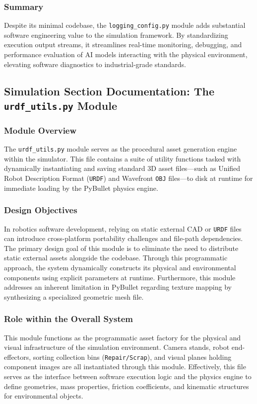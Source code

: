\documentclass{article}
\begin{document}
\subsubsection{Summary}
Despite its minimal codebase, the \texttt{logging\_config.py} module adds substantial software engineering value to the simulation framework. By standardizing execution output streams, it streamlines real-time monitoring, debugging, and performance evaluation of AI models interacting with the physical environment, elevating software diagnostics to industrial-grade standards.

\subsection{Simulation Section Documentation: The \texttt{urdf\_utils.py} Module}

\subsubsection{Module Overview}
The \texttt{urdf\_utils.py} module serves as the procedural asset generation engine within the simulator. This file contains a suite of utility functions tasked with dynamically instantiating and saving standard 3D asset files—such as Unified Robot Description Format (\texttt{URDF}) and Wavefront \texttt{OBJ} files—to disk at runtime for immediate loading by the PyBullet physics engine.

\subsubsection{Design Objectives}
In robotics software development, relying on static external CAD or \texttt{URDF} files can introduce cross-platform portability challenges and file-path dependencies. The primary design goal of this module is to eliminate the need to distribute static external assets alongside the codebase. Through this programmatic approach, the system dynamically constructs its physical and environmental components using explicit parameters at runtime. Furthermore, this module addresses an inherent limitation in PyBullet regarding texture mapping by synthesizing a specialized geometric mesh file.

\subsubsection{Role within the Overall System}
This module functions as the programmatic asset factory for the physical and visual infrastructure of the simulation environment. Camera stands, robot end-effectors, sorting collection bins (\texttt{Repair/Scrap}), and visual planes holding component images are all instantiated through this module. Effectively, this file serves as the interface between software execution logic and the physics engine to define geometries, mass properties, friction coefficients, and kinematic structures for environmental objects.
\end{document}
